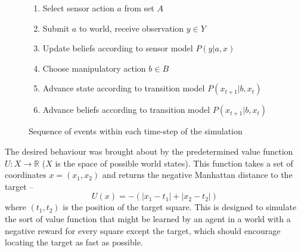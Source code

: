 \documentclass{article}
\begin{document}
\begin{figure}
\centering
\sffamily

\begin{enumerate}
	\item {Select sensor action \(a\) from set \(A\)}
	\item {Submit \(a\) to world, receive observation \(y \in Y\)}
	\item {Update beliefs according to sensor model \(P(y | a,x)\)}
	\item {Choose manipulatory action \(b \in B\)}
	\item {Advance state according to transition model \(P(x_{t+1} | b, x_t)\)}
	\item {Advance beliefs according to transition model \(P(x_{t+1} | b, x_t)\)}
\end{enumerate}

\caption{Sequence of events within each time-step of the simulation}
\label{fig:timestep}
\end{figure}

The desired behaviour was brought about by the predetermined value function 
\(U \colon X \to\mathbb{R}\) (\(X\) is the space of possible world states).
This function takes a set of coordinates \(x = (x_1, x_2)\) and returns the negative
Manhattan distance to the target --
\[
	U(x) = -(|x_1 - t_1| + |x_2 - t_2|)
\] where \((t_1, t_2)\) is the position of the target square. This is designed to 
simulate the sort of value function that might be learned by an agent in a world 
with a negative reward for every square except the target, which should encourage
locating the target as fast as possible.
\end{document}
